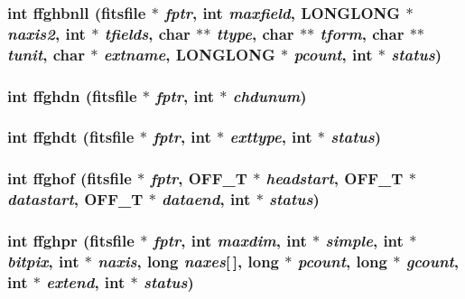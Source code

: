 \subsubsection{\setlength{\rightskip}{0pt plus 5cm}int ffghbnll (\bf{fitsfile} $\ast$ {\em fptr}, int {\em maxfield}, \bf{LONGLONG} $\ast$ {\em naxis2}, int $\ast$ {\em tfields}, char $\ast$$\ast$ {\em ttype}, char $\ast$$\ast$ {\em tform}, char $\ast$$\ast$ {\em tunit}, char $\ast$ {\em extname}, \bf{LONGLONG} $\ast$ {\em pcount}, int $\ast$ {\em status})}\label{src_2fitsio_8h_63346aca0b8254ae989a8c62e45a532a}


\subsubsection{\setlength{\rightskip}{0pt plus 5cm}int ffghdn (\bf{fitsfile} $\ast$ {\em fptr}, int $\ast$ {\em chdunum})}\label{src_2fitsio_8h_b931369499769d33e907da0a87a5f4b6}


\subsubsection{\setlength{\rightskip}{0pt plus 5cm}int ffghdt (\bf{fitsfile} $\ast$ {\em fptr}, int $\ast$ {\em exttype}, int $\ast$ {\em status})}\label{src_2fitsio_8h_b6397953ca4869d2d95466d0b69fab90}


\subsubsection{\setlength{\rightskip}{0pt plus 5cm}int ffghof (\bf{fitsfile} $\ast$ {\em fptr}, OFF\_\-T $\ast$ {\em headstart}, OFF\_\-T $\ast$ {\em datastart}, OFF\_\-T $\ast$ {\em dataend}, int $\ast$ {\em status})}\label{src_2fitsio_8h_ce0a6f7eeaab4cc5b53d42a9bcab393b}


\subsubsection{\setlength{\rightskip}{0pt plus 5cm}int ffghpr (\bf{fitsfile} $\ast$ {\em fptr}, int {\em maxdim}, int $\ast$ {\em simple}, int $\ast$ {\em bitpix}, int $\ast$ {\em naxis}, long {\em naxes}[$\,$], long $\ast$ {\em pcount}, long $\ast$ {\em gcount}, int $\ast$ {\em extend}, int $\ast$ {\em status})}\label{src_2fitsio_8h_5eb7c7db8772313ff2612637ef1a1bf3}


